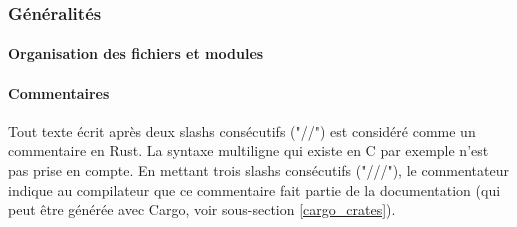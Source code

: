 \documentclass[a4paper, 12pt]{article}
\begin{document}
\subsubsection{Généralités}

\paragraph{Organisation des fichiers et modules}

\paragraph{Commentaires}
Tout texte écrit après deux slashs consécutifs ("//") est considéré comme un commentaire en Rust.
La syntaxe multiligne qui existe en C par exemple n'est pas prise en compte. En mettant trois slashs 
consécutifs ("///"), le commentateur indique au compilateur que ce commentaire fait partie de la 
documentation (qui peut être générée avec Cargo, voir sous-section \ref{cargo_crates}).
\end{document}
